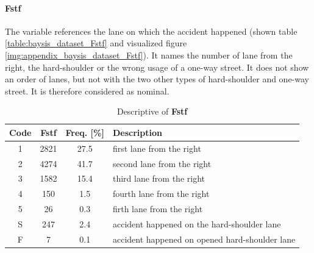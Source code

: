 \paragraph{Fstf}
The variable references the lane on which the accident happened (shown table \autoref{table:baysis_dataset_Fstf} and visualized figure \autoref{img:appendix_baysis_dataset_Fstf}). It names the number of lane from the right, the hard-shoulder or the wrong usage of a one-way street. It does not show an order of lanes, but not with the two other types of hard-shoulder and one-way street. It is therefore considered as nominal.
\begin{table}[ht]
	\centering
	\small
	\begin{tabular}{c|c|c|l}
		\toprule
		Code & \textbf{Fstf} & Freq. [\%] & Description \\ 
		\midrule  
		1 & 2821 	& 27.5 	& first lane from the right \\
		2 & 4274 	& 41.7 	& second lane from the right \\
		3 & 1582 	& 15.4 	& third lane from the right \\
		4 & 150 	& 1.5 	& fourth lane from the right \\
		5 & 26 		& 0.3 	& firth lane from the right \\ 
 		S & 247 	& 2.4 	& accident happened on the hard-shoulder lane \\ 
		F & 7 		& 0.1 	& accident happened on opened hard-shoulder lane \\
		\bottomrule
	\end{tabular}
	\caption{Descriptive of \textbf{Fstf}}
	\label{table:baysis_dataset_Fstf}
	\vspace{-8mm}
\end{table}
    
